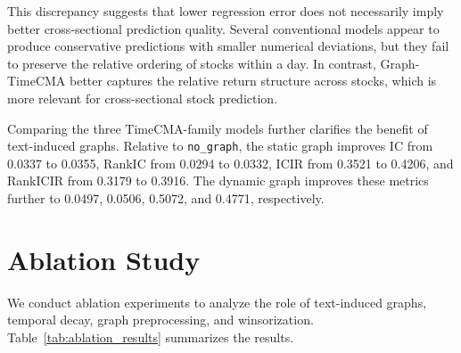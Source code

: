 \documentclass[runningheads]{llncs}
\begin{document}
This discrepancy suggests that lower regression error does not necessarily imply better cross-sectional prediction quality. Several conventional models appear to produce conservative predictions with smaller numerical deviations, but they fail to preserve the relative ordering of stocks within a day. In contrast, Graph-TimeCMA better captures the relative return structure across stocks, which is more relevant for cross-sectional stock prediction.

Comparing the three TimeCMA-family models further clarifies the benefit of text-induced graphs. Relative to \texttt{no\_graph}, the static graph improves IC from 0.0337 to 0.0355, RankIC from 0.0294 to 0.0332, ICIR from 0.3521 to 0.4206, and RankICIR from 0.3179 to 0.3916. The dynamic graph improves these metrics further to 0.0497, 0.0506, 0.5072, and 0.4771, respectively.

\begin{table}[t]
\centering
\small
\caption{Ablation study on the effects of graph usage, temporal decay, graph preprocessing, and winsorization. Best results are shown in bold.}
\label{tab:ablation_results}
\end{table}

\section{Ablation Study}

We conduct ablation experiments to analyze the role of text-induced graphs, temporal decay, graph preprocessing, and winsorization. Table~\ref{tab:ablation_results} summarizes the results.
\end{document}
